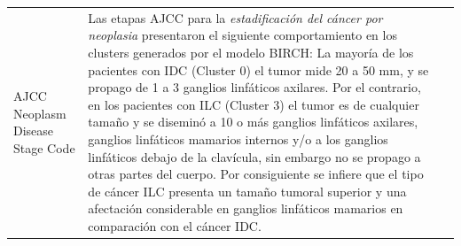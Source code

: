 \begin{table}[htb!]
\begin{threeparttable}
\begin{tabular}{p{2.5cm} p{7cm} p{6.5cm}}
			\\ \hline
			AJCC Neoplasm Disease Stage Code
			& Las etapas AJCC para la \textit{estadificación del cáncer por neoplasia} presentaron el siguiente comportamiento en los clusters generados por el modelo BIRCH: La mayoría de los pacientes con IDC (Cluster 0) el tumor mide 20 a 50 mm, y se  propago de 1 a 3 ganglios linfáticos axilares. Por el contrario, en los pacientes con ILC (Cluster 3) el  tumor es de cualquier tamaño y se diseminó a 10 o más ganglios linfáticos axilares, ganglios linfáticos mamarios internos y/o a los ganglios linfáticos debajo de la clavícula, sin embargo no se propago a otras partes del cuerpo. Por consiguiente se infiere que el tipo de cáncer ILC presenta un tamaño tumoral superior y una afectación considerable en ganglios linfáticos mamarios en comparación con el cáncer IDC.   
			

\end{tabular}
\end{threeparttable}
\end{table}
